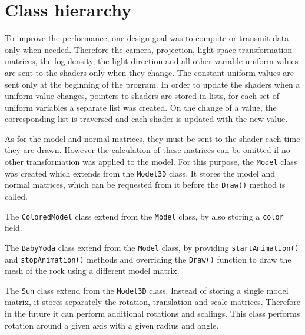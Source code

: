 \section{Class hierarchy} 


To improve the performance, one design goal was to compute or transmit data only when needed. Therefore the camera, projection, light space transformation matrices, the fog density, the light direction and all other variable uniform values are sent to the shaders only when they change. The constant uniform values are sent only at the beginning of the program. In order to update the shaders when a uniform value changes, pointers to shaders are stored in lists, for each set of uniform variables a separate list was created. On the change of a value, the corresponding list is traversed and each shader is updated with the new value.

As for the model and normal matrices, they must be sent to the shader each time they are drawn. However the calculation of these matrices can be omitted if no other transformation was applied to the model. For this purpose, the \verb|Model| class was created which extends from the \verb|Model3D| class. It stores the model and normal matrices, which can be requested from it before the \verb|Draw()| method is called.

The \verb|ColoredModel| class extend from the \verb|Model| class, by also storing a \verb|color| field.

The \verb|BabyYoda| class extend from the \verb|Model| class, by providing \verb|startAnimation()| and \verb|stopAnimation()| methods and overriding the \verb|Draw()| function to draw the mesh of the rock using a different model matrix.

The \verb|Sun| class extend from the \verb|Model3D| class. Instead of storing a single model matrix, it stores separately the rotation, translation and scale matrices. Therefore in the future it can perform additional rotations and scalings. This class performs rotation around a given axis with a given radius and angle.
